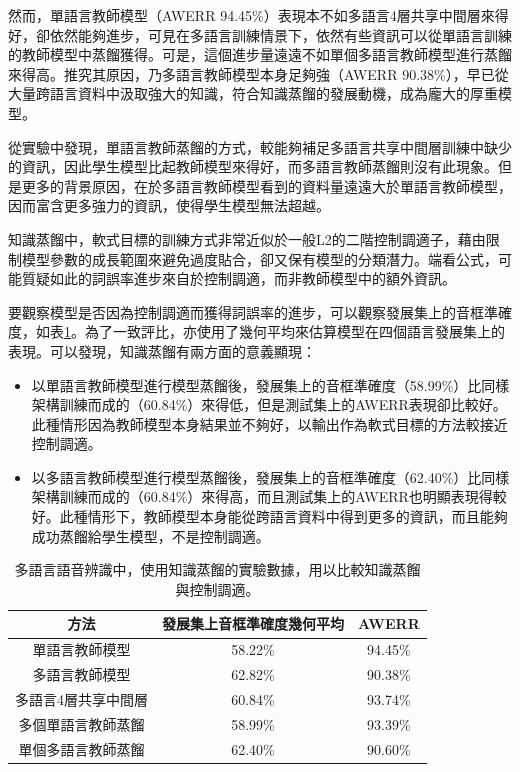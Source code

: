然而，單語言教師模型（AWERR 94.45\%）表現本不如多語言4層共享中間層來得好，卻依然能夠進步，可見在多語言訓練情景下，依然有些資訊可以從單語言訓練的教師模型中蒸餾獲得。可是，這個進步量遠遠不如單個多語言教師模型進行蒸餾來得高。推究其原因，乃多語言教師模型本身足夠強（AWERR 90.38\%），早已從大量跨語言資料中汲取強大的知識，符合知識蒸餾的發展動機，成為龐大的厚重模型。

從實驗中發現，單語言教師蒸餾的方式，較能夠補足多語言共享中間層訓練中缺少的資訊，因此學生模型比起教師模型來得好，而多語言教師蒸餾則沒有此現象。但是更多的背景原因，在於多語言教師模型看到的資料量遠遠大於單語言教師模型，因而富含更多強力的資訊，使得學生模型無法超越。

知識蒸餾中，軟式目標的訓練方式非常近似於一般L2的二階控制調適子，藉由限制模型參數的成長範圍來避免過度貼合，卻又保有模型的分類潛力。端看公式，可能質疑如此的詞誤率進步來自於控制調適，而非教師模型中的額外資訊。

要觀察模型是否因為控制調適而獲得詞誤率的進步，可以觀察發展集上的音框準確度，如表\ref{table:chap5_dev_set_acc}。為了一致評比，亦使用了幾何平均來估算模型在四個語言發展集上的表現。可以發現，知識蒸餾有兩方面的意義顯現：
\begin{itemize}
 \itemsep -2pt
 \item 以單語言教師模型進行模型蒸餾後，發展集上的音框準確度（58.99\%）比同樣架構訓練而成的（60.84\%）來得低，但是測試集上的AWERR表現卻比較好。此種情形因為教師模型本身結果並不夠好，以輸出作為軟式目標的方法較接近控制調適。
 \item 以多語言教師模型進行模型蒸餾後，發展集上的音框準確度（62.40\%）比同樣架構訓練而成的（60.84\%）來得高，而且測試集上的AWERR也明顯表現得較好。此種情形下，教師模型本身能從跨語言資料中得到更多的資訊，而且能夠成功蒸餾給學生模型，不是控制調適。
\end{itemize}
\begin{table}[htbp]
\centering
\begin{tabular}{|ccc|}
\hline
 方法 & 發展集上音框準確度幾何平均 & AWERR  \\
\hline
  單語言教師模型 & 58.22\% & 94.45\% \\
\hline
  多語言教師模型 & 62.82\% & 90.38\% \\
  多語言4層共享中間層 & 60.84\% &  93.74\% \\
\hline
  多個單語言教師蒸餾 & 58.99\% & 93.39\%  \\
  單個多語言教師蒸餾 & 62.40\% & 90.60\%  \\
\hline
\end{tabular}
\caption{多語言語音辨識中，使用知識蒸餾的實驗數據，用以比較知識蒸餾與控制調適。}
\label{table:chap5_dev_set_acc}
\end{table}

